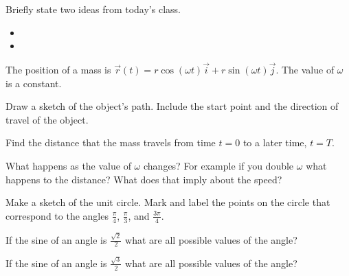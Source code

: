 \postClass

\begin{problem}
\item Briefly state two ideas from today's class.
  \begin{itemize}
  \item
  \item
  \end{itemize}
\item The position of a mass is
  $\vec{r}(t)=r\cos(\omega t)\vec{i}+r\sin(\omega t)\vec{j}$. The
  value of $\omega$ is a constant.
  \begin{subproblem}
  \item Draw a sketch of the object's path. Include the start point
    and the direction of travel of the object.
    \vfill
    \vfill
  \item Find the distance that the mass travels from time $t=0$ to a
    later time, $t=T$.
    \vfill
  \item What happens as the value of $\omega$ changes? For example
    if you double $\omega$ what happens to the distance? What does
    that imply about the speed?
    \vfill
  \end{subproblem}
\end{problem}



\begin{problem}
\item Make a sketch of the unit circle. Mark and label the points on
  the circle that correspond to the angles $\frac{\pi}{4}$,
  $\frac{\pi}{3}$, and $\frac{3\pi}{4}$.
  \vfill
  \vfill
\item If the sine of an angle is $\frac{\sqrt{2}}{2}$ what are all
  possible values of the angle?
  \vfill
\item If the sine of an angle is $\frac{\sqrt{3}}{2}$ what are all
  possible values of the angle?
  \vfill
\end{problem}


